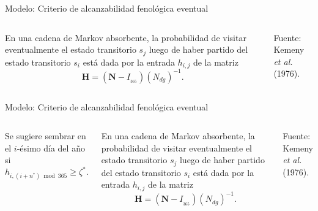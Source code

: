 \documentclass[aspectratio=169]{beamer}
\begin{document}
\begin{frame}{Modelo: Criterio de alcanzabilidad fenológica eventual}
	\vspace{-1cm}\begin{columns}
			
		En una cadena de Markov absorbente, la probabilidad de visitar eventualmente el estado transitorio $s_j$ luego de haber partido del estado transitorio $s_i$ está dada por la entrada $h_{i,j}$ de la matriz $$\mathbf{H}= (\mathbf{N} - I_{_{365}})(N_{dg})^{-1}.$$
		
		{\scriptsize Fuente: Kemeny \textit{et al.} (1976).}
	\end{columns}
\end{frame}

\begin{frame}{Modelo: Criterio de alcanzabilidad fenológica eventual}
	\vspace{-1cm}\begin{columns}
		\column{0.5\textwidth}
		
		\begin{block}{}
			Se sugiere sembrar en el $i$-ésimo día del año si $$h_{i,(i+n^*)\bmod{365}} \geq \zeta^*.$$
		\end{block}
		
		\column{0.5\textwidth}
		En una cadena de Markov absorbente, la probabilidad de visitar eventualmente el estado transitorio $s_j$ luego de haber partido del estado transitorio $s_i$ está dada por la entrada $h_{i,j}$ de la matriz $$\mathbf{H}= (\mathbf{N} - I_{_{365}})(N_{dg})^{-1}.$$
		
		{\scriptsize Fuente: Kemeny \textit{et al.} (1976).}
	\end{columns}
\end{frame}
\end{document}
